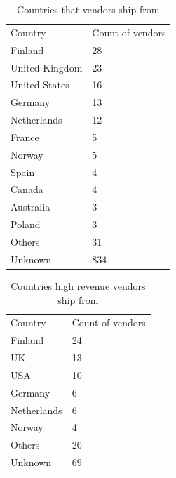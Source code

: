 \documentclass[
  digital, %
  table,   %
  lof,     %
  lot,     %
  oneside
]{fithesis3}
\begin{document}
\begin{table}
    \caption{Countries that vendors ship from}
    \label{shipcount}
    \begin{tabular}{|l|l|}
    Country  & Count of vendors\\
        Finland                                      & 28  \\ 
        United Kingdom                               & 23  \\ 
        United States                                & 16  \\ 
        Germany                                      & 13  \\ 
        Netherlands                                  & 12  \\ 
        France                                       & 5   \\ 
        Norway                                       & 5   \\ 
        Spain                                        & 4   \\ 
        Canada                                       & 4   \\ 
        Australia                                    & 3   \\ 
        Poland                                       & 3  \\  
        Others                                       & 31   \\
        Unknown                                      & 834  \\
    \end{tabular}
\end{table}

\begin{table}
    \caption{Countries high revenue vendors ship from}
    \label{richvendors}
    \begin{tabular}{|l|l|}
    Country & Count of vendors\\
Finland & 24 \\
UK & 13 \\
USA & 10 \\
Germany & 6 \\
Netherlands & 6 \\
Norway & 4 \\
Others & 20 \\ 
Unknown & 69 \\
    \end{tabular}
\end{table}
\end{document}
